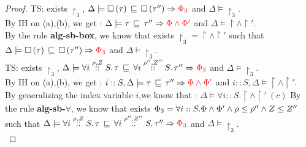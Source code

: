 \begin{proof}
TS: exists $\restriction_3$, $ \Delta \models \eqvt{ \tbox{\type}   }{ \tbox{\type''}
  }{\restriction_3 } $ and $ \Delta \models \restriction_3 $.\\
By IH on (a),(b), we get : $ \Delta \models \eqvt{ \type  }{ \type'' 
  }{\restriction \land \restriction' } $ and $ \Delta \models \restriction \land \restriction'$.\\
  By the rule \textbf{alg-sb-box}, we know that exists $\restriction_3 = \restriction \land \restriction'  $ such that $ \Delta \models \eqvt{ \tbox{\type} }{\tbox{\type''} 
  }{\restriction_3 } $ and $ \Delta \models \restriction_3 $.\\
  
TS: exists $\restriction_3$, $ \Delta \models \eqvt{ \tforall{\dmap}{\nnatA}{i} \type   }{ \tforall{\dmap''}{\nnatA''}{i} \type''
  }{\restriction_3 } $ and $ \Delta \models \restriction_3 $.\\
 By IH on (a),(b), we get : $ i::S, \Delta \models \eqvt{ \type  }{ \type'' 
  }{\restriction \land \restriction' } $ and $ i::S, \Delta \models \restriction \land \restriction'$.\\
  By generalizing the index variable $i$,we know that : $ \Delta \models \forall i::S. \restriction \land \restriction'~(c)$
  By the rule \textbf{alg-sb-$\forall$}, we know that exists $\restriction_3 = \forall i::S.\restriction \land \restriction' \land \dmap \leq \dmap'' \land \nnatA \leq \nnatA'' $ such that $ \Delta \models \eqvt{ \tforall{\dmap}{\nnatA}{i} \type }{ \tforall{\dmap''}{\nnatA''}{i} \type'' 
  }{\restriction_3 } $ and $ \Delta \models \restriction_3 $.\\
  
\end{proof}